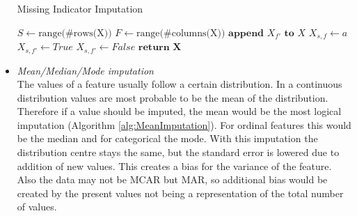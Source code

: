 \documentclass[10pt,a4paper]{report}
\begin{document}
\begin{itemize}
		\begin{algorithm}[H]
			\caption{Missing Indicator Imputation}\label{alg:MissingIndicatorImputation}
			\begin{algorithmic}[1]
				\State $S \gets \text{range(\#rows(X))}$ 	
				\State $F \gets \text{range(\#columns(X))}$ 	
				 					
				 				 			
				\State $\textbf{append } X_{f'} \textbf{ to } X$	
				 
				 				 
				\State $X_{s,f} \gets a$	
				\State $X_{s,f'} \gets True$	
				\Else
				\State $X_{s,f'} \gets False$ 
				\EndIf
				\EndFor
				\EndIf
				\EndFor
				\State $\textbf{return X}$
				\EndProcedure
			\end{algorithmic}
		\end{algorithm}
		
		\item \textit{Mean/Median/Mode imputation} \\
		The values of a feature usually follow a certain distribution. In a continuous distribution values are most probable to be the mean of the distribution. Therefore if a value should be imputed, the mean would be the most logical imputation (Algorithm \ref{alg:MeanImputation}). For ordinal features this would be the median and for categorical the mode\cite{haukoos2007advanced, myrtveit2001analyzing, cartwright2003dealing}. With this imputation the distribution centre stays the same, but the standard error is lowered due to addition of new values. This creates a bias for the variance of the feature. Also the data may not be MCAR but MAR, so additional bias would be created by the present values not being a representation of the total number of values\cite{donders2006gentle, pedersen2017missing}.
		

\end{itemize}
\end{document}
